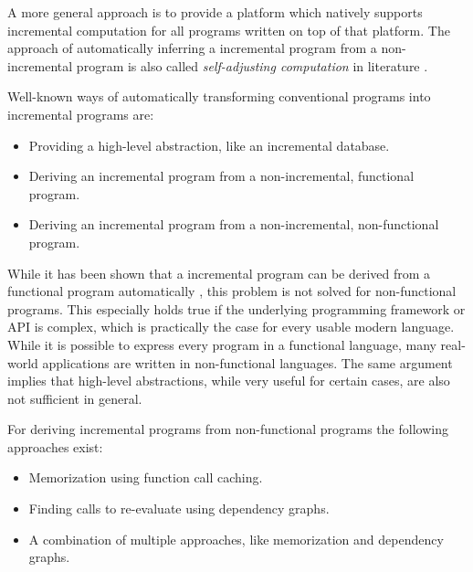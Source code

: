 A more general approach is to provide a platform which natively supports incremental computation for all programs written on top of that platform. The approach of automatically inferring a incremental program from a non-incremental program is also called \textit{self-adjusting computation} in literature \cite{Harper2004} \cite{Acar2005thesis}. 

Well-known ways of automatically transforming conventional programs into incremental programs are: 
\begin{itemize}
\item Providing a high-level abstraction, like an incremental database. \cite{Peng2010}
\item Deriving an incremental program from a non-incremental, functional program. \cite{liu1995systematic}  \cite{ley2008compiling} 
\item Deriving an incremental program from a non-incremental, non-functional program. \cite{heydon2000caching} \cite{Pugh1989} \cite{cohen1991dynamic} \cite{naiadIncremental} \cite{Hammer2009} \cite{Chen2014} \cite{Acar2008} \cite{acar2006adaptive} 
\end{itemize}

While it has been shown that a incremental program can be derived from a functional program automatically \cite{ley2008compiling}, this problem is not solved for non-functional programs. This especially holds true if the underlying programming framework or API is complex, which is practically the case for every usable modern language. While it is possible to express every program in a functional language, many real-world applications are written in non-functional languages. 
The same argument implies that high-level abstractions, while very useful for certain cases, are also not sufficient in general. 

For deriving incremental programs from non-functional programs the following approaches exist: 
\begin{itemize}
\item Memorization using function call caching. \cite{heydon2000caching} \cite{Pugh1989} 
\item Finding calls to re-evaluate using dependency graphs. \cite{cohen1991dynamic}
\item A combination of multiple approaches, like memorization and dependency graphs. \cite{Hammer2009} \cite{Chen2014} \cite{Acar2008} \cite{acar2006adaptive} \cite{naiadIncremental}
\end{itemize}

